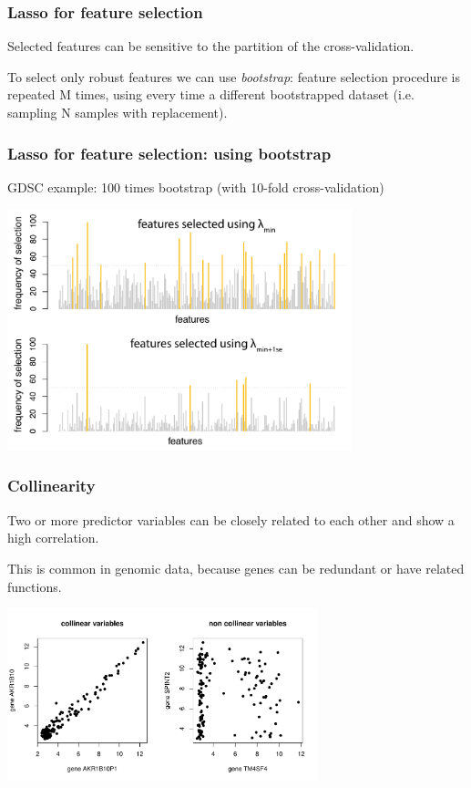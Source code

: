 \documentclass[notes]{beamer}          %
\begin{document}
\begin{frame}
\frametitle{Lasso for feature selection}

Selected features can be sensitive to the partition of the cross-validation.

\vspace{5mm} 

To select only robust features we can use \textit{bootstrap}: feature selection procedure is repeated M times, using every time a different bootstrapped dataset (i.e. sampling N samples with replacement).

\end{frame}


\begin{frame}
\frametitle{Lasso for feature selection: using bootstrap}
GDSC example: 100 times bootstrap (with 10-fold cross-validation)

\begin{center}
\includegraphics[height=7cm]{../figures/week_2_linear_models/Lasso_feature_selection_bootstrap.pdf}
\end{center}

\end{frame}




\begin{frame}
\frametitle{Collinearity}
Two or more predictor variables can be closely related to each other and show a high correlation.

\vspace{5mm} 

This is common in genomic data, because genes can be redundant or have related functions.

\begin{center}
\includegraphics[height=5cm]{../figures/week_2_linear_models/collinearity.pdf}
\end{center}

\end{frame}
\end{document}
